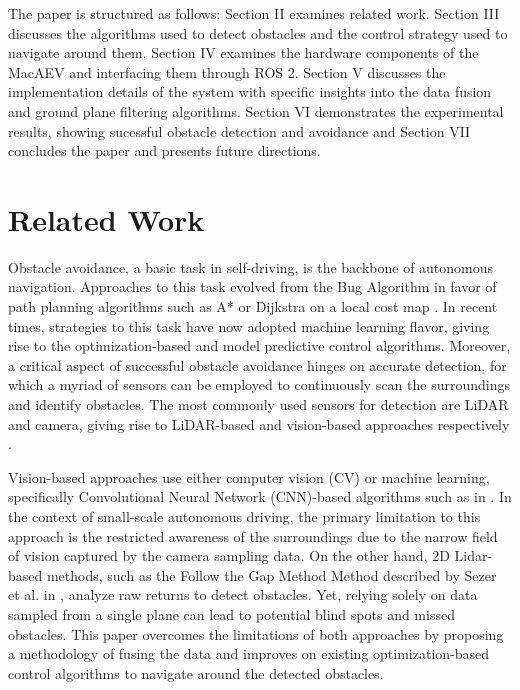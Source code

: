 \documentclass[conference]{IEEEtran}
\begin{document}

The paper is structured as follows: Section II examines related work. Section III discusses the 
algorithms used to detect obstacles and the control strategy used to navigate around them. Section IV examines the hardware components of the MacAEV and interfacing them through ROS 2. Section V discusses the implementation details of the system with specific insights into the data fusion and ground plane filtering algorithms. Section VI demonstrates the experimental results, showing sucessful obstacle detection and avoidance and Section VII concludes the paper and presents future directions. 


\section{Related Work}
Obstacle avoidance, a basic task in self-driving, is the backbone of autonomous navigation. Approaches to this task evolved from the Bug Algorithm in favor of path planning algorithms such as A* or Dijkstra on a local cost map \cite{b1}. In recent times, strategies to this task have now adopted machine learning flavor, giving rise to the optimization-based and model predictive control algorithms.    
Moreover, a critical aspect of successful obstacle avoidance hinges on accurate detection, for which a myriad of sensors can be employed to continuously scan the surroundings and identify obstacles. The most commonly used sensors for detection are LiDAR and camera, giving rise to LiDAR-based and vision-based approaches respectively \cite{b2}. 

Vision-based approaches use either computer vision (CV) or machine learning, specifically Convolutional Neural Network (CNN)-based algorithms such as in \cite{b3}. In the context of small-scale autonomous driving, the primary limitation to this approach is the restricted awareness of the surroundings due to the narrow field of vision captured by the camera sampling data. On the other hand, 2D Lidar-based methods, such as the Follow the Gap Method Method described by Sezer et al. in \cite{b4}, analyze raw returns to detect obstacles. Yet, relying solely on data sampled from a single plane can lead to potential blind spots and missed obstacles. This paper overcomes the limitations of both approaches by proposing a methodology of fusing the data and improves on existing optimization-based control algorithms to navigate around the detected obstacles.
\end{document}
